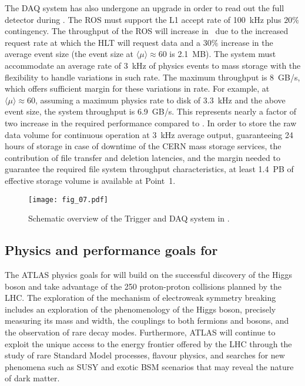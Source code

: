 \documentclass[cernpreprint, atlasdraft=false, UKenglish,british,orcidlogo, texmf, orcidlogo]{atlasdoc}
\begin{document}
The \gls{DAQ} system has also undergone an upgrade in order to read out the full detector during \RunThr. The \gls{ROS} must support the \gls{L1} accept rate of \SI{100}{\kHz} plus $20\%$ contingency. The throughput of the \gls{ROS} will increase in \RunThr\ due to the increased request rate at which the \gls{HLT} will request data and a $30\%$ increase in the average event size (the event size at $\langle\mu\rangle \approx 60$ is \SI{2.1}{MB}).
The system must accommodate an average rate of \SI{3}{\kHz} of physics events to mass storage with the flexibility to handle variations in such rate. The maximum throughput is \SI{8}{GB/s}, which offers sufficient margin for these variations in rate. For example, at $\langle\mu\rangle \approx 60$, assuming a maximum physics rate to disk of \SI{3.3}{\kHz} and the above event size, the system throughput is \SI{6.9}{GB/s}. This represents nearly a factor of two increase in the required performance compared to \RunTwo.  In order to store the raw data volume for continuous operation at \SI{3}{\kHz} average output, guaranteeing 24 hours of storage in case of downtime of the CERN mass storage services, the contribution of file transfer and deletion latencies, and the margin needed to guarantee the required file system throughput characteristics, at least \SI{1.4}{PB} of effective storage volume is available at Point~1.
 
\begin{figure}[b]
\centerline{\texttt{[image: fig\_07.pdf]}}
\caption{Schematic overview of the Trigger and \gls{DAQ} system in \RunThr. }
\label{fig:Overview:TDAQ}       
\end{figure}
 
 
\subsection{Physics and performance goals for \RunThr}
\label{sec:Overview:PhysPerfGoals}
 
The ATLAS physics goals for \RunThr will build on the successful discovery of the Higgs boson and take advantage of the \SI{250}{\ifb} proton-proton collisions planned by the \gls{LHC}. The exploration of the mechanism of electroweak symmetry breaking includes an exploration of the phenomenology of the Higgs boson, precisely measuring its mass and width, the couplings to both fermions and bosons, and the observation of rare decay modes. Furthermore, ATLAS will continue to exploit the unique access to the energy frontier offered by the \gls{LHC} through the study of rare Standard Model processes, flavour physics, and searches for new phenomena such as \gls{SUSY} and exotic \gls{BSM} scenarios that may reveal the nature of dark matter.
 
\end{document}
